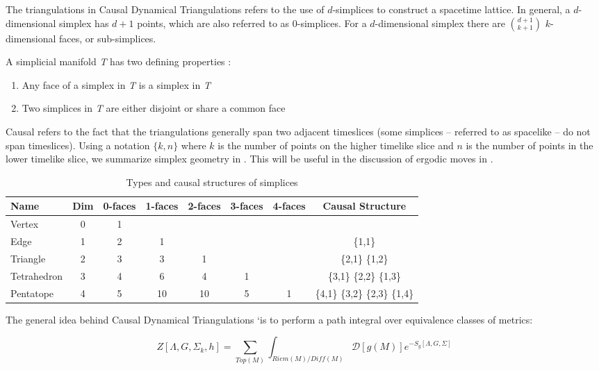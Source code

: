 \documentclass[12pt]{article}
\begin{document}
The triangulations in Causal Dynamical Triangulations refers to the use of $d$-simplices to construct a spacetime lattice. In general, a $d$-dimensional simplex has $d+1$ points, which are also referred to as $0$-simplices. For a $d$-dimensional simplex there are $\binom{d+1}{k+1}$ $k$-dimensional faces, or sub-simplices.

A simplicial manifold \textit{T} has two defining properties \cite{cgal:eb-12b}:

\begin{enumerate}
  \item Any face of a simplex in \textit{T} is a simplex in \textit{T}
  \item Two simplices in \textit{T} are either disjoint or share a common face
\end{enumerate}

Causal refers to the fact that the triangulations generally span two adjacent timeslices (some simplices -- referred to as spacelike -- do not span timeslices). Using a notation $\{k,n\}$ where $k$ is the number of points on the higher timelike slice and $n$ is the number of points in the lower timelike slice, we summarize simplex geometry in . This will be useful in the discussion of ergodic moves in .

\begin{table}
\centering
\begin{tabular}{|l|c|c|c|c|c|c|c|}
\hline
Name & Dim & 0-faces & 1-faces & 2-faces & 3-faces & 4-faces & Causal Structure \\
\hline
\hline
Vertex & 0 & 1 & & & & & \\
Edge & 1 & 2 & 1 & & & & \{1,1\} \\
Triangle & 2 & 3 & 3 & 1 & & & \{2,1\} \{1,2\}\\
Tetrahedron & 3 & 4 & 6 & 4 & 1 & & \{3,1\} \{2,2\} \{1,3\} \\
Pentatope & 4 & 5 & 10 & 10 & 5 & 1 & \{4,1\} \{3,2\} \{2,3\} \{1,4\} \\
\hline
\end{tabular}
\caption[Simplex types]{Types and causal structures of simplices}
\label{table:simplices}
\end{table}

The general idea behind Causal Dynamical Triangulations `is to perform a path integral over equivalence classes of metrics:

\begin{equation}
  Z[\Lambda,G,\Sigma_k,h]=\sum_{Top(M)}\int_{Riem(M)/Diff(M)}\mathcal{D}[g(M)]e^{-S_g[\Lambda,G,\Sigma]}
\end{equation}
\end{document}
